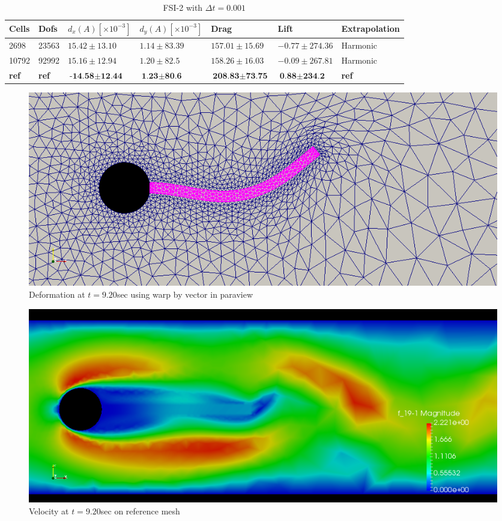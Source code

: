 \begin{table}[H]
\centering
\caption{FSI-2 with $\Delta t = 0.001$}
\label{my-label}
\begin{tabular}{|l|l|l|l|l|l|l|}
\hline
Cells & Dofs & $d_x(A) [\times10^{-3}]$ & $d_y(A) [\times10^{-3}]$ & Drag & Lift & Extrapolation \\ \hline
2698 & 23563 & $ 15.42 \pm 13.10$ & $1.14 \pm 83.39$ & $157.01 \pm 15.69$ & $ -0.77 \pm 274.36$ & Harmonic \\ \hline
10792 & 92992 & $ 15.16 \pm 12.94$ & $ 1.20 \pm 82.5 $ & $ 158.26 \pm 16.03$ & $ -0.09 \pm 267.81$ & Harmonic \\ \hline
\textbf{ref} & \textbf{ref} & $\textbf{-14.58} \pm \textbf{12.44}$ & $\textbf{1.23} \pm \textbf{80.6}$ & $\textbf{208.83} \pm \textbf{73.75}  $ & $\textbf{0.88} \pm \textbf{234.2} $ & \textbf{ref} \\ \hline
\end{tabular}
\end{table}

\begin{figure}[H]
\caption{Deformation at $t =9.20 $sec  using warp by vector in paraview}
\includegraphics[scale=0.40,trim={0mm 0mm 0mm 0mm},clip]{./Verification_Validation/Hron_Turek/FSI2_d_920.png}
\end{figure}
\begin{figure}[H]
\caption{Velocity at $ t = 9.20 $sec on reference mesh}
\includegraphics[scale=0.40,trim={0mm 0mm 0mm 0mm},clip]{./Verification_Validation/Hron_Turek/FSI2_u_920.png}
\end{figure}


